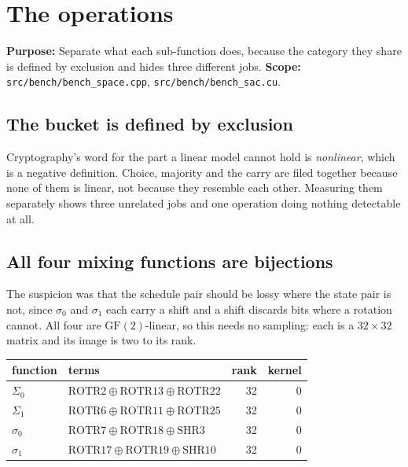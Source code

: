 \chapter{The operations}

\textbf{Purpose:} Separate what each sub-function does, because the category they share is defined by exclusion and hides three different jobs. \textbf{Scope:} \texttt{src/\allowbreak{}bench/\allowbreak{}bench\_\allowbreak{}space.\allowbreak{}cpp}, \texttt{src/\allowbreak{}bench/\allowbreak{}bench\_\allowbreak{}sac.\allowbreak{}cu}.

\section{The bucket is defined by exclusion}

Cryptography's word for the part a linear model cannot hold is \emph{nonlinear}, which is a negative definition. Choice, majority and the carry are filed together because none of them is linear, not because they resemble each other. Measuring them separately shows three unrelated jobs and one operation doing nothing detectable at all.

\section{All four mixing functions are bijections}

The suspicion was that the schedule pair should be lossy where the state pair is not, since \(\sigma_0\) and \(\sigma_1\) each carry a shift and a shift discards bits where a rotation cannot. All four are \(\mathrm{GF}(2)\)-linear, so this needs no sampling: each is a \(32 \times 32\) matrix and its image is two to its rank.

\begin{center}
\begin{tabular}{llrr}
\toprule
function & terms & rank & kernel \\
\midrule
\(\Sigma_0\) & \(\mathrm{ROTR}2 \oplus \mathrm{ROTR}13 \oplus \mathrm{ROTR}22\) & 32 & 0 \\
\(\Sigma_1\) & \(\mathrm{ROTR}6 \oplus \mathrm{ROTR}11 \oplus \mathrm{ROTR}25\) & 32 & 0 \\
\(\sigma_0\) & \(\mathrm{ROTR}7 \oplus \mathrm{ROTR}18 \oplus \mathrm{SHR}3\) & 32 & 0 \\
\(\sigma_1\) & \(\mathrm{ROTR}17 \oplus \mathrm{ROTR}19 \oplus \mathrm{SHR}10\) & 32 & 0 \\
\bottomrule
\end{tabular}
\end{center}

